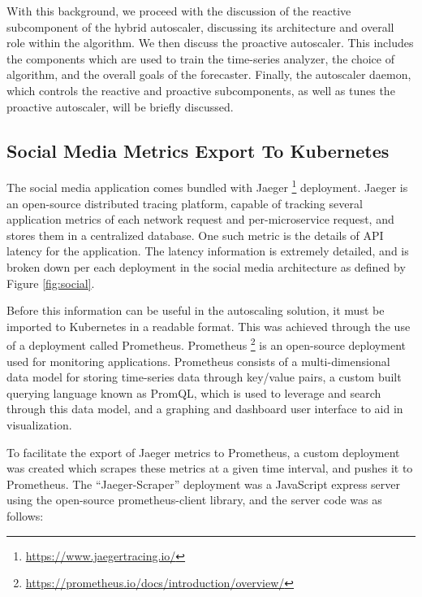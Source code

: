 With this background, we proceed with the discussion of the reactive subcomponent of the hybrid autoscaler, discussing its architecture and overall role within the algorithm. We then discuss the proactive autoscaler. This includes the components which are used to train the time-series analyzer, the choice of algorithm, and the overall goals of the forecaster. Finally, the autoscaler daemon, which controls the reactive and proactive subcomponents, as well as tunes the proactive autoscaler, will be briefly discussed.\par

\subsection{Social Media Metrics Export To Kubernetes}
\label{subsec:metrics-export}

The social media application comes bundled with Jaeger \footnote{\url{https://www.jaegertracing.io/}} deployment. Jaeger is an open-source distributed tracing platform, capable of tracking several application metrics of each network request and per-microservice request, and stores them in a centralized database. One such metric is the details of API latency for the application. The latency information is extremely detailed, and is broken down per each deployment in the social media architecture as defined by Figure \ref{fig:social}.\par

Before this information can be useful in the autoscaling solution, it must be imported to Kubernetes in a readable format. This was achieved through the use of a deployment called Prometheus. Prometheus \footnote{\url{https://prometheus.io/docs/introduction/overview/}} is an open-source deployment used for monitoring applications. Prometheus consists of a multi-dimensional data model for storing time-series data through key/value pairs, a custom built querying language known as PromQL, which is used to leverage and search through this data model, and a graphing and dashboard user interface to aid in visualization.\par

To facilitate the export of Jaeger metrics to Prometheus, a custom deployment was created which scrapes these metrics at a given time interval, and pushes it to Prometheus. The ``Jaeger-Scraper'' deployment was a JavaScript express server using the open-source prometheus-client library, and the server code was as follows:


